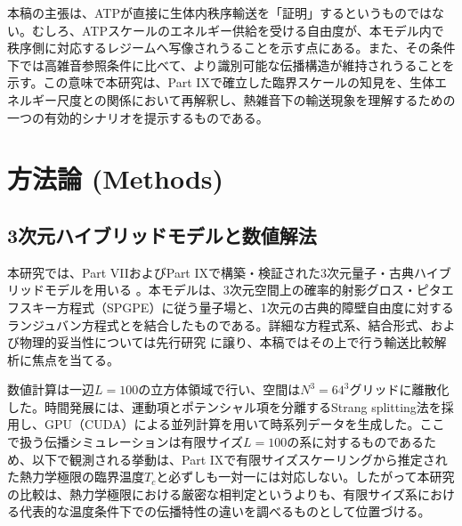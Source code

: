 \documentclass[a4paper,11pt,ja=standard,lualatex]{bxjsarticle}
\begin{document}
本稿の主張は、ATPが直接に生体内秩序輸送を「証明」するというものではない。むしろ、ATPスケールのエネルギー供給を受ける自由度が、本モデル内で秩序側に対応するレジームへ写像されうることを示す点にある。また、その条件下では高雑音参照条件に比べて、より識別可能な伝播構造が維持されうることを示す。この意味で本研究は、Part IXで確立した臨界スケールの知見を、生体エネルギー尺度との関係において再解釈し、熱雑音下の輸送現象を理解するための一つの有効的シナリオを提示するものである。

\FloatBarrier

\section{方法論 (Methods)}
\label{sec:methods}

\subsection{3次元ハイブリッドモデルと数値解法}
本研究では、Part VIIおよびPart IXで構築・検証された3次元量子・古典ハイブリッドモデルを用いる \cite{Konno2025v7, Konno2025v9}。本モデルは、3次元空間上の確率的射影グロス・ピタエフスキー方程式（SPGPE）に従う量子場と、1次元の古典的障壁自由度に対するランジュバン方程式とを結合したものである。詳細な方程式系、結合形式、および物理的妥当性については先行研究 \cite{Konno2025v7, Konno2025v9} に譲り、本稿ではその上で行う輸送比較解析に焦点を当てる。

数値計算は一辺$L=100$の立方体領域で行い、空間は$N^3 = 64^3$グリッドに離散化した。時間発展には、運動項とポテンシャル項を分離するStrang splitting法を採用し、GPU（CUDA）による並列計算を用いて時系列データを生成した。ここで扱う伝播シミュレーションは有限サイズ$L=100$の系に対するものであるため、以下で観測される挙動は、Part IXで有限サイズスケーリングから推定された熱力学極限の臨界温度$T_c$と必ずしも一対一には対応しない。したがって本研究の比較は、熱力学極限における厳密な相判定というよりも、有限サイズ系における代表的な温度条件下での伝播特性の違いを調べるものとして位置づける。
\end{document}
